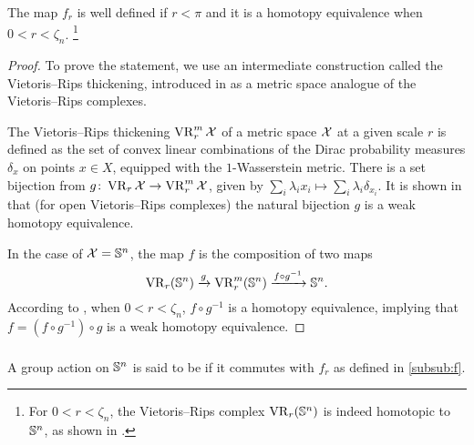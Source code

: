 \medskip\lemma
The map $f_r$ is well defined if $r < \pi$ and it is a homotopy equivalence when $0 < r < \zeta_n$.
\footnote{For $0 < r < \zeta_n$, the Vietoris--Rips complex $\operatorname{VR}_r(\mathbb{S}^n)$ is indeed homotopic to $\mathbb{S}^n$, as shown in \cite[Theorem 7.1]{lim2020vietoris}.}

\begin{proof}
	To prove the statement, we use an intermediate construction called the Vietoris--Rips thickening, introduced in \cite{adamaszek2018metric} as a metric space analogue of the Vietoris--Rips complexes.

	The Vietoris--Rips thickening $\operatorname{VR}_r^m\mathcal{X}$ of a metric space $\mathcal{X}$ at a given scale $r$ is defined as the set of convex linear combinations of the Dirac probability measures $\delta_{x}$ on points $x \in X$, equipped with the $1$-Wasserstein metric.
	There is a set bijection from $g \colon \operatorname{VR}_r\mathcal{X} \to \operatorname{VR}_r^m\mathcal{X}$, given by $\sum_i \lambda_i x_i \mapsto \sum_i \lambda_i \delta_{x_i}.$
	It is shown in \cite[Theorem 1]{gillespie2024vietoris} that (for open Vietoris--Rips complexes) the natural bijection $g$ is a weak homotopy equivalence.

	In the case of $\mathcal{X} = \mathbb{S}^n$, the map $f$ is the composition of two maps
	\[
	\operatorname{VR}_r(\mathbb{S}^n) \xrightarrow{g} \operatorname{VR}_r^m(\mathbb{S}^n) \xrightarrow{f \circ g^{-1}} \mathbb{S}^n.
	\]
	According to \cite[Proposition 5.3]{adamaszek2018metric}, when $0<r<\zeta_n$, $f \circ g^{-1}$ is a homotopy equivalence, implying that $f = (f \circ g^{-1}) \circ g$ is a weak homotopy equivalence.
\end{proof}

\subsubsection{}\label{subsub:rho}

A group action on \(\mathbb{S}^n\) is said to be  if it commutes with \(f_r\) as defined in \cref{subsub:f}.

